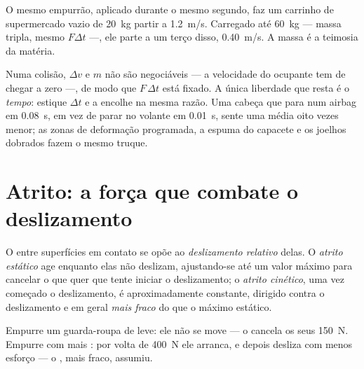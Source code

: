 \begin{example}\label{ex:g11:forces-and-motion:cart}
O mesmo empurrão, aplicado durante o mesmo segundo, faz um carrinho de
supermercado vazio de \qty{20}{kg} partir a \qty{1.2}{m/s}. Carregado até
\qty{60}{kg} --- massa tripla, mesmo $F\Delta t$ ---, ele parte a um
terço disso, \qty{0.40}{m/s}. A massa é a teimosia da matéria.
\end{example}

\begin{remark}\label{rem:g11:forces-and-motion:airbag}
Numa colisão, $\Delta v$ e $m$ não são negociáveis --- a velocidade do
ocupante tem de chegar a zero ---, de modo que $F\,\Delta t$ está fixado.
A única liberdade que resta é o \emph{tempo}: estique $\Delta t$ e a
 encolhe na mesma razão. Uma cabeça que para num airbag em
\qty{0.08}{s}, em vez de parar no volante em \qty{0.01}{s}, sente uma
 média oito vezes menor; as zonas de deformação programada, a
espuma do capacete e os joelhos dobrados fazem o mesmo truque.
\end{remark}

\section{Atrito: a força que combate o deslizamento}

\begin{definition}\label{def:g11:forces-and-motion:friction}
O  entre superfícies em contato se opõe ao \emph{deslizamento
relativo} delas. O \emph{atrito estático} age
enquanto elas não deslizam, ajustando-se até um valor máximo para
cancelar o que quer que tente iniciar o deslizamento; o \emph{atrito
cinético}, uma vez começado o deslizamento, é
aproximadamente constante, dirigido contra o deslizamento e em geral
\emph{mais fraco} do que o máximo estático.
\end{definition}

\begin{example}\label{ex:g11:forces-and-motion:wardrobe}
Empurre um guarda-roupa de leve: ele não se move --- o 
cancela os seus \qty{150}{N}. Empurre com mais : por volta de
\qty{400}{N} ele arranca, e depois desliza com menos esforço --- o
, mais fraco, assumiu.
\end{example}

